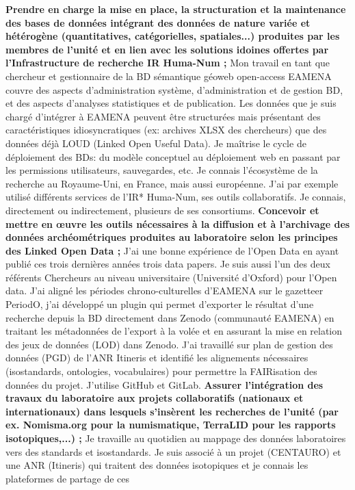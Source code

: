 \documentclass[12pt]{article}
\begin{document}
\textbf{Prendre en charge la mise en place, la structuration et la maintenance des bases de données intégrant des données de
nature variée et hétérogène (quantitatives, catégorielles, spatiales...) produites par les membres de l'unité et en lien
avec les solutions idoines offertes par l'Infrastructure de recherche IR Huma-Num ;}
Mon travail en tant que chercheur et gestionnaire de la BD sémantique géoweb open-access EAMENA couvre des aspects
d'administration système, d'administration et de gestion BD, et des aspects d'analyses statistiques et de publication. Les
données que je suis chargé d'intégrer à EAMENA peuvent être structurées mais présentant des caractéristiques
idiosyncratiques (ex: archives XLSX des chercheurs) que des données déjà LOUD (Linked Open Useful Data). Je
maîtrise le cycle de déploiement des BDs: du modèle conceptuel au déploiement web en passant par les permissions
utilisateurs, sauvegardes, etc. Je connais l'écosystème de la recherche au Royaume-Uni, en France, mais aussi
européenne. J'ai par exemple utilisé différents services de l'IR* Huma-Num, ses outils collaboratifs. Je connais,
directement ou indirectement, plusieurs de ses consortiums.
\smallbreak
\textbf{Concevoir et mettre en œuvre les outils nécessaires à la diffusion et à l'archivage des données archéométriques
produites au laboratoire selon les principes des Linked Open Data ;}
J'ai une bonne expérience de l'Open Data en ayant publié ces trois dernières années trois data papers. Je suis aussi l'un
des deux référents Chercheurs au niveau universitaire (Université d'Oxford) pour l'Open data. J'ai aligné les périodes
chrono-culturelles d'EAMENA sur le gazetteer PeriodO, j'ai développé un plugin qui permet d'exporter le résultat d'une
recherche depuis la BD directement dans Zenodo (communauté EAMENA) en traitant les métadonnées de l'export à la
volée et en assurant la mise en relation des jeux de données (LOD) dans Zenodo. J'ai travaillé sur plan de gestion des
données (PGD) de l'ANR Itineris et identifié les alignements nécessaires (isostandards, ontologies, vocabulaires) pour
permettre la FAIRisation des données du projet. J'utilise GitHub et GitLab.
\smallbreak
\textbf{Assurer l'intégration des travaux du laboratoire aux projets collaboratifs (nationaux et internationaux) dans lesquels
s'insèrent les recherches de l'unité (par ex. Nomisma.org pour la numismatique, TerraLID pour les rapports isotopiques,...) ;}
Je travaille au quotidien au mappage des données laboratoires vers des standards et isostandards. Je suis associé à un
projet (CENTAURO) et une ANR (Itineris) qui traitent des données isotopiques et je connais les plateformes de partage de ces
\end{document}
